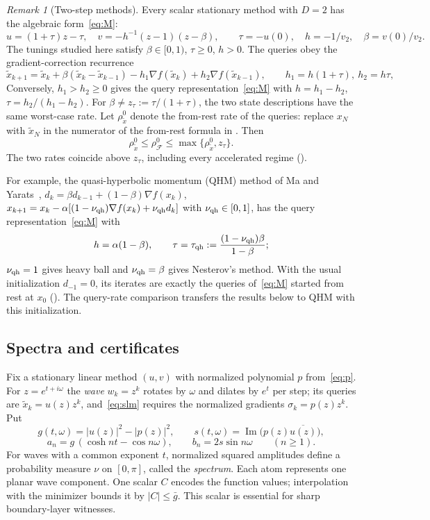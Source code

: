 \documentclass[11pt]{article}
\theoremstyle{definition}
\theoremstyle{remark}
\newtheorem{remark}[theorem]{Remark}
\newcommand{\cF}{\mathcal F}
\newcommand{\ch}{\cosh}
\newcommand{\Ima}{\operatorname{Im}}
\newcommand{\rhoz}{\rho_{\cF}^{0}}
\begin{document}
\begin{remark}[Two-step methods]\label{rem:twostep}
Every scalar stationary method with \(D=2\) has the algebraic form~\eqref{eq:M}:
\[
u=(1+\tau)z-\tau,\quad v=-h^{-1}(z-1)(z-\beta),\qquad
\tau=-u(0),\quad h=-1/v_2,\quad\beta=v(0)/v_2.
\]
The tunings studied here satisfy \(\beta\in[0,1)\), \(\tau\ge0\), \(h>0\).
The queries obey the gradient-correction recurrence
\[
\tilde x_{k+1}=\tilde x_k+\beta(\tilde x_k-\tilde x_{k-1})-h_1\nabla f(\tilde x_k)+h_2\nabla f(\tilde x_{k-1}),\qquad h_1=h(1+\tau),\ h_2=h\tau ,
\]
Conversely, \(h_1>h_2\ge0\) gives the query representation~\eqref{eq:M}
with \(h=h_1-h_2\), \(\tau=h_2/(h_1-h_2)\).
For \(\beta\ne z_\tau:=\tau/(1+\tau)\), the two state descriptions have the same
worst-case rate.  Let \(\rho^0_{\tilde x}\) denote the from-rest rate of the
queries: replace \(x_N\) with \(\tilde x_N\) in the numerator of the from-rest formula
in .
Then
\[
\rho^0_{\tilde x}\le\rhoz\le\max\{\rho^0_{\tilde x},z_\tau\}.
\]
The two rates coincide above \(z_\tau\), including every accelerated regime
().

For example, the quasi-hyperbolic momentum (QHM) method of Ma and Yarats~\cite{MY19},
\(d_k=\beta d_{k-1}+(1-\beta)\nabla f(x_k)\), \(x_{k+1}=x_k-\alpha[(1-\nu_{\rm qh})\nabla f(x_k)+\nu_{\rm qh}d_k]\) with
\(\nu_{\rm qh}\in[0,1]\), has the query representation~\eqref{eq:M} with
\[
h=\alpha(1-\beta),\qquad \tau=\tau_{\rm qh}:=\frac{(1-\nu_{\rm qh})\beta}{1-\beta};
\]
\(\nu_{\rm qh}=1\) gives heavy ball and \(\nu_{\rm qh}=\beta\) gives Nesterov's method.  With the usual
initialization \(d_{-1}=0\), its iterates are exactly the queries of~\eqref{eq:M} started from rest at \(x_0\)
().  The query-rate comparison transfers the results below
to QHM with this initialization.
\end{remark}

\subsection{Spectra and certificates}

Fix a stationary linear method \((u,v)\) with normalized polynomial \(p\)
from~\eqref{eq:p}.  For \(z=e^{t+i\omega}\) the \emph{wave} \(w_k=z^k\)
rotates by \(\omega\) and dilates by \(e^t\) per step; its queries are
\(\tilde x_k=u(z)z^k\), and~\eqref{eq:slm} requires the normalized gradients
\(\sigma_k=p(z)z^k\).  Put
\begin{equation}\label{eq:gs}
g(t,\omega)=|u(z)|^2-|p(z)|^2,\qquad s(t,\omega)=\Ima\bigl(p(z)\overline{u(z)}\bigr),
\end{equation}
\begin{equation}\label{eq:anbn}
a_n=g\,(\ch nt-\cos n\omega),\qquad b_n=2s\sin n\omega\qquad(n\ge1).
\end{equation}
For waves with a common exponent \(t\), normalized squared amplitudes define
a probability measure \(\nu\) on \([0,\pi]\), called the \emph{spectrum}.
Each atom represents one planar wave component.  One scalar \(C\) encodes the
function values; interpolation with the minimizer bounds it by \(|C|\le\bar g\).
This scalar is essential for sharp boundary-layer witnesses.
\end{document}
